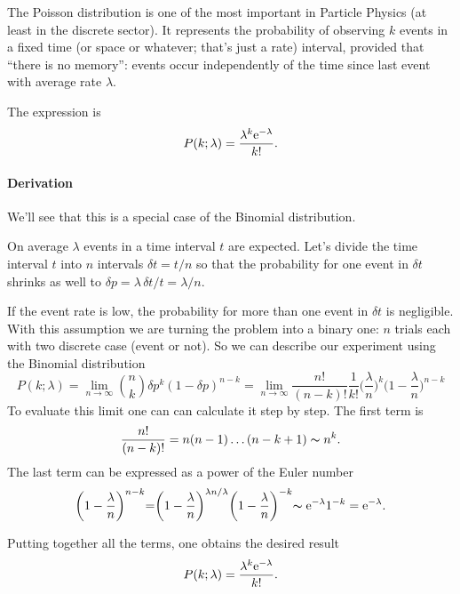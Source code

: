 The Poisson distribution is one of the most important in Particle Physics (at least in the discrete sector).
It represents the probability of observing $k$ events in a fixed time (or space or whatever; that's just a rate) interval, provided that ``there is no memory'': events occur independently of the time since last event with average rate $\lambda$.

The expression is
\begin{equation}
	P(k;\lambda) = \frac{\lambda^k \mathrm{e}^{-\lambda}}{k!}.
\end{equation}

\paragraph{Derivation} We'll see that this is a special case of the Binomial distribution.

On average $\lambda$ events in a time interval $t$ are expected.
Let's divide the time interval $t$ into $n$ intervals $\delta t = t/n$ so that the probability for one event in $\delta t$ shrinks as well to $\delta p = \lambda \,\delta t/t = \lambda/n$.

If the event rate is low, the probability for more than one event in $\delta t$ is negligible.
With this assumption we are turning the problem into a binary one: $n$ trials each with two discrete case (event or not).
So we can describe our experiment using the Binomial distribution
\begin{equation}
	P(k;\lambda) = \lim_{n\to\infty} {n\choose k} \delta p^k( 1  - \delta p)^{n - k}
	= \lim_{n\to \infty} \frac{n!}{(n-k)!}\frac{1}{k!}\biggr(\frac{\lambda}{n}\biggl)^k\biggr(1-\frac{\lambda}{n}\biggl)^{n-k}
\end{equation}
To evaluate this limit one can can calculate it step by step.
The first term is
\begin{equation}
	\frac{n!}{(n-k)!} = n(n-1)\dots(n-k+1) \thicksim n^k.
\end{equation}
The last term can be expressed as a power of the Euler number
\begin{equation}
	\biggr(1-\frac{\lambda}{n}\biggl)^{n-k} = \biggr(1-\frac{\lambda}{n}\biggl)^{\lambda n/\lambda} \biggr(1-\frac{\lambda}{n}\biggl)^{-k} \thicksim \mathrm{e}^{-\lambda} 1^{-k} = \mathrm{e}^{-\lambda}.
\end{equation}


Putting together all the terms, one obtains the desired result
\begin{equation}
	P(k;\lambda) = \frac{\lambda^k \mathrm{e}^{-\lambda}}{k!}.
\end{equation}

